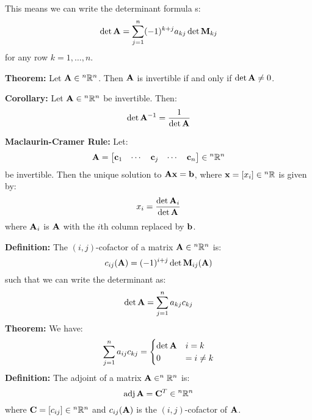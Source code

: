 \documentclass{article}
\begin{document}
    \begin{minipage}[t]{0.45\linewidth}
        This means we can write the determinant formula s:
        \begin{equation*}
            \det \mathbf{A} = \sum_{j=1}^n (-1)^{k+j}a_{kj} \det \mathbf{M}_{kj}
        \end{equation*}
        for any row $k=1,\dots,n$.
        \vspace{2mm}

        \textbf{Theorem:} Let $\mathbf{A} \in {^n}\mathbb{R}^n$. Then $\mathbf{A}$ is invertible if and only if $\det \mathbf{A} \neq 0$.
        \vspace{2mm}

        \textbf{Corollary:} Let $\mathbf{A} \in {^n}\mathbb{R}^n$ be invertible. Then: $$\det \mathbf{A}^{-1} = \frac{1}{\det \mathbf{A}}$$

        \textbf{Maclaurin-Cramer Rule:} Let:
        \begin{equation*}
            \mathbf{A} = \begin{bmatrix}
                
                \mathbf{c}_1 & \cdots & \mathbf{c}_j & \cdots & \mathbf{c}_n
            \end{bmatrix} \in {^n}\mathbb{R}^n
        \end{equation*}
        be invertible. Then the unique solution to $\mathbf{Ax}=\mathbf{b}$, where $\mathbf{x}=[x_i] \in {^n}\mathbb{R}$ is given by:
        \begin{equation*}
            x_i = \frac{\det \mathbf{A}_i}{\det \mathbf{A}}
        \end{equation*}
        where $\mathbf{A}_i$ is $\mathbf{A}$ with the $i$th column replaced by $\mathbf{b}$.
        \vspace{2mm}

        \textbf{Definition:} The $(i,j)$-cofactor of a matrix $\mathbf{A} \in {^n}\mathbb{R}^n$ is:
        \begin{equation*}
            c_{ij}(\mathbf{A}) = (-1)^{i+j}\det \mathbf{M}_{ij}(\mathbf{A})
        \end{equation*}
        such that we can write the determinant as:
        \begin{equation*}
            \det \mathbf{A} = \sum_{j=1}^n a_{kj}c_{kj}
        \end{equation*}
        \textbf{Theorem:} We have:
        \begin{equation*}
            \sum_{j=1}^n a_{ij}c_{kj} = \begin{cases}
                \det \mathbf{A} & i=k \\ 
                0 &= i\neq k
            \end{cases}
        \end{equation*}
        \textbf{Definition:} The adjoint of a matrix $\mathbf{A} \in ^{n}\mathbb{R}^n$ is:
        \begin{equation*}
            \mathrm{adj}\,\mathbf{A} = \mathbf{C}^T \in {^n}\mathbb{R}^n
        \end{equation*}
        where $\mathbf{C}=[c_{ij}]\in {^n}\mathbb{R}^n$ and $c_{ij}\bf{(A)}$ is the $(i,j)$-cofactor of $\mathbf{A}$.
        \vspace{2mm}


\end{minipage}
\end{document}
